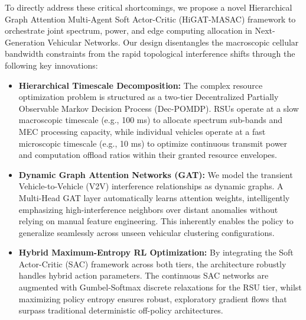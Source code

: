To directly address these critical shortcomings, we propose a novel Hierarchical Graph Attention Multi-Agent Soft Actor-Critic (HiGAT-MASAC) framework to orchestrate joint spectrum, power, and edge computing allocation in Next-Generation Vehicular Networks. Our design disentangles the macroscopic cellular bandwidth constraints from the rapid topological interference shifts through the following key innovations:

\begin{itemize}
    \item \textbf{Hierarchical Timescale Decomposition:} The complex resource optimization problem is structured as a two-tier Decentralized Partially Observable Markov Decision Process (Dec-POMDP). RSUs operate at a slow macroscopic timescale (e.g., 100 ms) to allocate spectrum sub-bands and MEC processing capacity, while individual vehicles operate at a fast microscopic timescale (e.g., 10 ms) to optimize continuous transmit power and computation offload ratios within their granted resource envelopes.
    \item \textbf{Dynamic Graph Attention Networks (GAT):} We model the transient Vehicle-to-Vehicle (V2V) interference relationships as dynamic graphs. A Multi-Head GAT layer automatically learns attention weights, intelligently emphasizing high-interference neighbors over distant anomalies without relying on manual feature engineering. This inherently enables the policy to generalize seamlessly across unseen vehicular clustering configurations.
    \item \textbf{Hybrid Maximum-Entropy RL Optimization:} By integrating the Soft Actor-Critic (SAC) framework across both tiers, the architecture robustly handles hybrid action parameters. The continuous SAC networks are augmented with Gumbel-Softmax discrete relaxations for the RSU tier, whilst maximizing policy entropy ensures robust, exploratory gradient flows that surpass traditional deterministic off-policy architectures.
\end{itemize}

